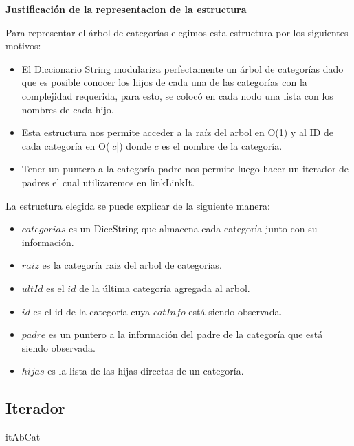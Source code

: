 \documentclass[10pt, a4paper]{article}
\newcommand{\modTitulo}[1]{
  \vspace*{1ex}\par\noindent\textbf{\large #1}\par
}
\begin{document}
\modTitulo{Justificaci\'on de la representacion de la estructura}
Para representar el \'arbol de categor\'ias elegimos esta estructura por los siguientes motivos:
\begin{itemize}
	\item El Diccionario String modulariza perfectamente un \'arbol de categor\'ias dado que es posible conocer los hijos de cada una de las categor\'ias con la complejidad requerida, para esto, se coloc\'o en cada nodo una lista con los nombres de cada hijo. \\
	\item Esta estructura nos permite acceder a la ra\'iz del arbol en O(1) y al ID de cada categor\'ia en O(|$c$|) donde $c$ es el nombre de la categor\'ia.\\
	\item Tener un puntero a la categor\'ia padre nos permite luego hacer un iterador de padres el cual utilizaremos en linkLinkIt.\\
\end{itemize}

La estructura elegida se puede explicar de la siguiente manera:
\begin{itemize}
	\item $categorias$ es un DiccString que almacena cada categor\'ia junto con su informaci\'on. \\
	\item $raiz$ es la categor\'ia raiz del arbol de categorias.\\
	\item $ultId$ es el $id$ de la \'ultima categor\'ia agregada al arbol.\\
	\item $id$ es el id de la categor\'ia cuya $catInfo$ est\'a siendo observada.\\
	\item $padre$ es un puntero a la informaci\'on del padre de la categor\'ia que est\'a siendo observada.\\
	\item $hijas$ es la lista de las hijas directas de un categor\'ia.\\
\end{itemize}

\subsection{Iterador}

	\begin{Estructura}{itAbCat}
	    \begin{Tupla}
	    \end{Tupla}
	\end{Estructura}
\end{document}
